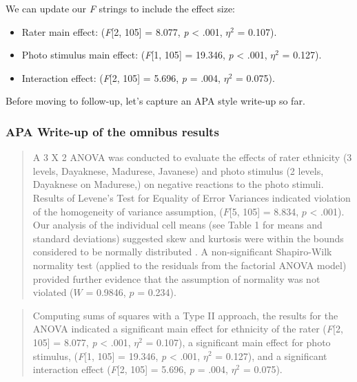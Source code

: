 \documentclass[
  11pt,
]{book}
\providecommand{\tightlist}{%
  \setlength{\itemsep}{0pt}\setlength{\parskip}{0pt}}
\begin{document}
We can update our \emph{F} strings to include the effect size:

\begin{itemize}
\tightlist
\item
  Rater main effect: (\emph{F}{[}2, 105{]} = 8.077, \emph{p} \textless{} .001, \(\eta ^{2}\) = 0.107).
\item
  Photo stimulus main effect: (\emph{F}{[}1, 105{]} = 19.346, \emph{p} \textless{} .001, \(\eta ^{2}\) = 0.127).
\item
  Interaction effect: (\emph{F}{[}2, 105{]} = 5.696, \emph{p} = .004, \(\eta ^{2}\) = 0.075).
\end{itemize}

Before moving to follow-up, let's capture an APA style write-up so far.

\hypertarget{apa-write-up-of-the-omnibus-results}{%
\subsubsection{APA Write-up of the omnibus results}\label{apa-write-up-of-the-omnibus-results}}

\begin{quote}
A 3 X 2 ANOVA was conducted to evaluate the effects of rater ethnicity (3 levels, Dayaknese, Madurese, Javanese) and photo stimulus (2 levels, Dayaknese on Madurese,) on negative reactions to the photo stimuli. Results of Levene's Test for Equality of Error Variances indicated violation of the homogeneity of variance assumption, (\(F\){[}5, 105{]} = 8.834, \(p\) \textless{} .001). Our analysis of the individual cell means (see Table 1 for means and standard deviations) suggested skew and kurtosis were within the bounds considered to be normally distributed \citep{kline_principles_2016}. A non-significant Shapiro-Wilk normality test (applied to the residuals from the factorial ANOVA model) provided further evidence that the assumption of normality was not violated (\(W\) = 0.9846, \(p\) = 0.234).
\end{quote}

\begin{quote}
Computing sums of squares with a Type II approach, the results for the ANOVA indicated a significant main effect for ethnicity of the rater (\emph{F}{[}2, 105{]} = 8.077, \emph{p} \textless{} .001, \(\eta ^{2}\) = 0.107), a significant main effect for photo stimulus, (\emph{F}{[}1, 105{]} = 19.346, \emph{p} \textless{} .001, \(\eta ^{2}\) = 0.127), and a significant interaction effect (\emph{F}{[}2, 105{]} = 5.696, \emph{p} = .004, \(\eta ^{2}\) = 0.075).
\end{quote}
\end{document}
